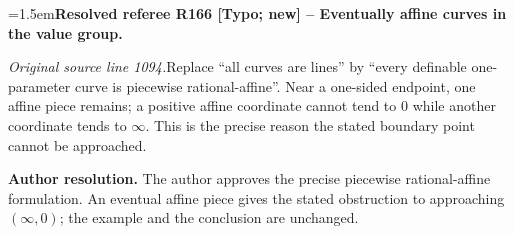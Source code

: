 \documentclass[12pt]{amsart}
\newcommand{\ResolvedRefereeRemark}[5]{%
  \par\medskip\begingroup\normalfont\small\color{gray}%
  \emergencystretch=1.5em\noindent\textbf{Resolved referee R#1 [#2] -- #3.}\par\nobreak\noindent #4\par
  \medskip\color{ResolutionGreen}\noindent\textbf{Author resolution.} #5\par
  \endgroup\medskip
}
\theoremstyle{plain}
\theoremstyle{definition}
\theoremstyle{remark}
\numberwithin{equation}{section}
\theoremstyle{plain}
\newcommand{\MM}{\mdl M}
\newcommand{\0}{\emptyset}
\newcommand{\mdl}[1]{\mathcal{#1}}  %
\newcommand{\fun}{\longrightarrow}
\newcommand{\mi}{\smallsetminus}
\DeclareMathOperator{\vv}{val}
\begin{document}
\ResolvedRefereeRemark{166}{Typo; new}{Eventually affine curves in the value group}{%
\textit{Original source line 1094.}\quad Replace ``all curves are lines'' by ``every definable one-parameter curve is piecewise rational-affine''. Near a one-sided endpoint, one affine piece remains; a positive affine coordinate cannot tend to $0$ while another coordinate tends to $\infty$. This is the precise reason the stated boundary point cannot be approached.
}{The author approves the precise piecewise rational-affine formulation. An eventual affine piece gives the stated obstruction to approaching $(\infty,0)$; the example and the conclusion are unchanged.}

\end{document}
